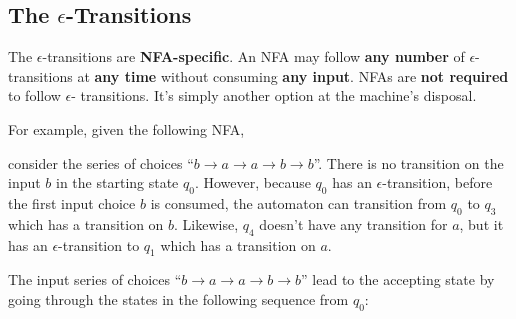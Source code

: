 \documentclass[12pt, letterpaper, oneside]{book}
\begin{document}
\subsection{The \texorpdfstring{$\epsilon$}{}-Transitions}

The $\epsilon$-transitions are \textbf{NFA-specific}. An NFA may follow \textbf{any number} of $\epsilon$-transitions
at \textbf{any time} without consuming \textbf{any input}. NFAs are \textbf{not required} to follow $\epsilon$-
transitions. It's simply another option at the machine's disposal.

For example, given the following NFA,


consider the series of choices ``$b \rightarrow a \rightarrow a \rightarrow b \rightarrow b$''. There is no transition
on the input $b$ in the starting state $q_0$. However, because $q_0$ has an $\epsilon$-transition, before the first
input choice $b$ is consumed, the automaton can transition from $q_0$ to $q_3$ which has a transition on $b$. Likewise,
$q_4$ doesn't have any transition for $a$, but it has an $\epsilon$-transition to $q_1$ which has a transition on $a$.

The input series of choices ``$b \rightarrow a \rightarrow a \rightarrow b \rightarrow b$'' lead to the accepting state
by going through the states in the following sequence from $q_0$:
\end{document}
